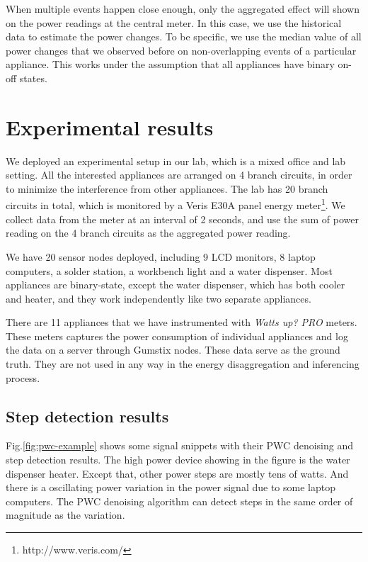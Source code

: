When multiple events happen close enough, only the aggregated effect will shown on the power readings at the central meter. In this case, we use the historical data to estimate the power changes. To be specific, we use the median value of all power changes that we observed before on non-overlapping events of a particular appliance. This works under the assumption that all appliances have binary on-off states.

\section{Experimental results}

We deployed an experimental setup in our lab, which is a mixed office and lab setting. All the interested appliances are arranged on 4 branch circuits, in order to minimize the interference from other appliances. The lab has 20 branch circuits in total, which is monitored by a Veris E30A panel energy meter\footnote{http://www.veris.com/}. We collect data from the meter at an interval of 2 seconds, and use the sum of power reading on the 4 branch circuits as the aggregated power reading.

We have 20 sensor nodes deployed, including 9 LCD monitors, 8 laptop computers, a solder station, a workbench light and a water dispenser. Most appliances are binary-state, except the water dispenser, which has both cooler and heater, and they work independently like two separate appliances. 

There are 11 appliances that we have instrumented with \textit{Watts up? PRO} meters. These meters captures the power consumption of individual appliances and log the data on a server through Gumstix nodes. These data serve as the ground truth. They are not used in any way in the energy disaggregation and inferencing process. 

\subsection{Step detection results}

Fig.\ref{fig:pwc-example} shows some signal snippets with their PWC denoising and step detection results. The high power device showing in the figure is the water dispenser heater. Except that, other power steps are mostly tens of watts. And there is a oscillating power variation in the power signal due to some laptop computers. The PWC denoising algorithm can detect steps in the same order of magnitude as the variation. 



